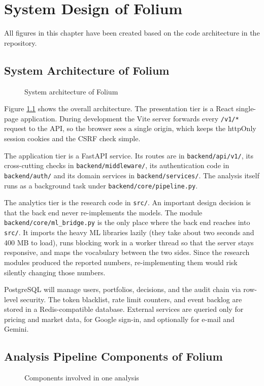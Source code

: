 \chapter{System Design of Folium}
All figures in this chapter have been created based on the code architecture in the repository.

\section{System Architecture of Folium}
\begin{figure}[H]
\centering
\resizebox{\textwidth}{!}{}
\caption{System architecture of Folium}
\label{fig:arch}
\end{figure}

Figure \ref{fig:arch} shows the overall architecture. The presentation tier is a React single-page application. During development the Vite server forwards every \texttt{/v1/*} request to the API, so the browser sees a single origin, which keeps the httpOnly session cookies and the CSRF check simple.

{\raggedright The application tier is a FastAPI service. Its routes are in \texttt{backend/api/v1/}, its cross-cutting checks in \texttt{backend/middleware/}, its authentication code in \texttt{backend/auth/} and its domain services in \texttt{backend/services/}. The analysis itself runs as a background task under \texttt{backend/core/pipeline.py}.\par}

The analytics tier is the research code in \texttt{src/}. An important design decision is that the back end never re-implements the models. The module \texttt{backend/core/ml\_bridge.py} is the only place where the back end reaches into \texttt{src/}. It imports the heavy ML libraries lazily (they take about two seconds and 400 MB to load), runs blocking work in a worker thread so that the server stays responsive, and maps the vocabulary between the two sides. Since the research modules produced the reported numbers, re-implementing them would risk silently changing those numbers.

PostgreSQL will manage users, portfolios, decisions, and the audit chain via row-level security. The token blacklist, rate limit counters, and event backlog are stored in a Redis-compatible database. External services are queried only for pricing and market data, for Google sign-in, and optionally for e-mail and Gemini.

\section{Analysis Pipeline Components of Folium}
\begin{figure}[H]
\centering
\resizebox{0.95\textwidth}{!}{}
\caption{Components involved in one analysis}
\label{fig:components}
\end{figure}

